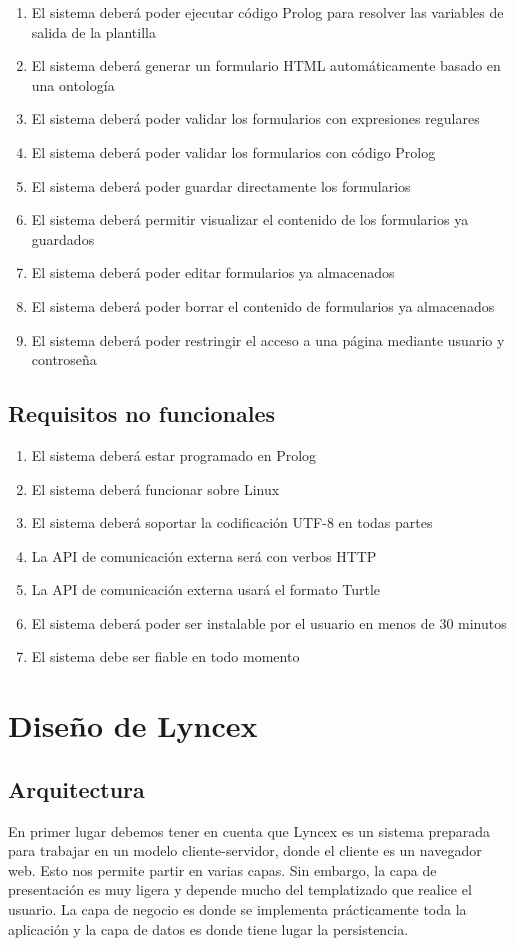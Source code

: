 \documentclass[12pt]{report} %
\begin{document}
\begin{enumerate}
    \item El sistema deberá poder ejecutar código Prolog para resolver las variables de salida de la plantilla
    \item El sistema deberá generar un formulario HTML automáticamente basado en una ontología
    \item El sistema deberá poder validar los formularios con expresiones regulares
    \item El sistema deberá poder validar los formularios con código Prolog
    \item El sistema deberá poder guardar directamente los formularios
    \item El sistema deberá permitir visualizar el contenido de los formularios ya guardados
    \item El sistema deberá poder editar formularios ya almacenados
    \item El sistema deberá poder borrar el contenido de formularios ya almacenados
    \item El sistema deberá poder restringir el acceso a una página mediante usuario y controseña
\end{enumerate}

\subsection{Requisitos no funcionales}
\begin{enumerate}
    \item El sistema deberá estar programado en Prolog
    \item El sistema deberá funcionar sobre Linux
    \item El sistema deberá soportar la codificación UTF-8 en todas partes
    \item La API de comunicación externa será con verbos HTTP
    \item La API de comunicación externa usará el formato Turtle
    \item El sistema deberá poder ser instalable por el usuario en menos de 30 minutos
    \item El sistema debe ser fiable en todo momento
\end{enumerate}

\section{Diseño de Lyncex}

\subsection{Arquitectura}
En primer lugar debemos tener en cuenta que Lyncex es un sistema preparada para trabajar en un modelo cliente-servidor, donde el cliente es un navegador web. Esto nos permite partir en varias capas. Sin embargo, la capa de presentación es muy ligera y depende mucho del templatizado que realice el usuario. La capa de negocio es donde se implementa prácticamente toda la aplicación y la capa de datos es donde tiene lugar la persistencia.
\end{document}
